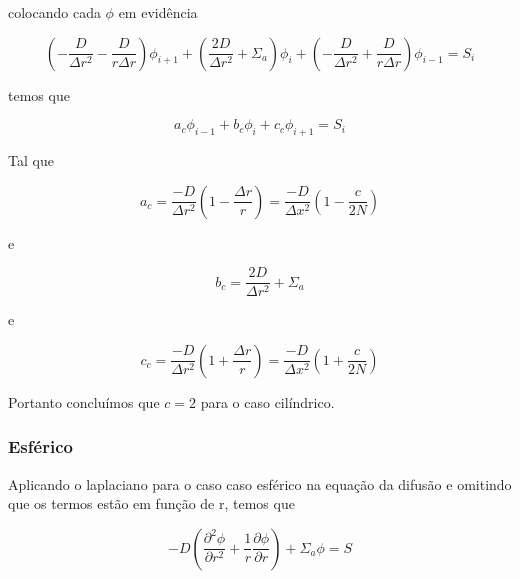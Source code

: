 \documentclass{article}
\begin{document}
                colocando cada $\phi$ em evidência
                
                \begin{equation}
                    ( -\frac{D}{\Delta r^2} - \frac{D}{r \Delta r} ) \phi_{i+1}    +    (\frac{2D}{\Delta r^2} + \Sigma_a) \phi_i    +    (-\frac{D}{\Delta r^2} + \frac{D}{r \Delta r} ) \phi_{i-1} = S_i
                \end{equation}
    
                temos que
                
                \begin{equation}
                    a_c \phi_{i-1}    +    b_c \phi_i    +    c_c \phi_{i+1} = S_i
                \end{equation}
        
                Tal que
        
                \begin{equation}
                    a_c = \frac{-D}{\Delta r^2} (1 - \frac{\Delta r}{r}) = \frac{-D}{\Delta x^2} ( 1 - \frac{c}{2N}) 
                \end{equation}
                
                e
        
                \begin{equation}
                    b_c = \frac{2D}{\Delta r^2} + \Sigma_a
                \end{equation}
                
                e
        
                \begin{equation}
                    c_c = \frac{-D}{\Delta r^2} (1 + \frac{\Delta r}{r}) = \frac{-D}{\Delta x^2} ( 1 + \frac{c}{2N}) 
                \end{equation}
    
                Portanto concluímos que $c=2$ para o caso cilíndrico.
                
            \subsubsection{Esférico}

                Aplicando o laplaciano para o caso caso esférico na equação da difusão e omitindo que os termos estão em função de r, temos que
            
                \begin{equation}
                    -D ( \frac{\partial^2\phi}{\partial r^2}  + \frac{1}{r} \frac{\partial\phi}{\partial r} ) + \Sigma_a \phi = S
                \end{equation}
        
\end{document}
